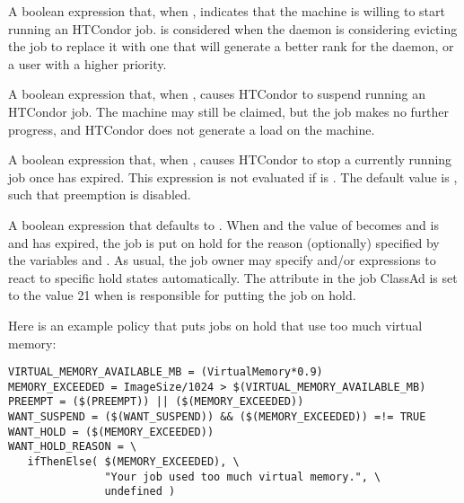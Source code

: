 \begin{description}

\label{param:Start}
\item[\Macro{START}]
  A boolean expression
  that, when , indicates that the machine is willing
  to start running an HTCondor job.
   is considered when the  daemon
  is considering evicting the job to replace it with one that will
  generate a better rank for the  daemon,
  or a user with a higher priority.

\label{param:Suspend}
\item[\Macro{SUSPEND}]
  A boolean expression that, when ,
  causes HTCondor to suspend running an HTCondor job.
  The machine may still be claimed, but the job makes no further
  progress, and HTCondor does not generate a load on the machine.

\label{param:Preempt}
\item[\Macro{PREEMPT}]
  A boolean expression that, when ,
  causes HTCondor to stop a currently running job once
   has expired.  This expression is not
  evaluated if  is .
  The default value is , such that preemption is disabled.

\label{param:WantHold}
\item[\Macro{WANT\_HOLD}]
  A boolean expression that defaults to .
  When  and the value of  becomes 
  and  is  and 
  has expired,
  the job is put on hold for the reason
  (optionally) specified by the variables  and
  .
  As usual, the job owner may specify
   and/or 
  expressions to react to specific hold states automatically.
  The attribute  in the job ClassAd is set to 
  the value 21 when
   is responsible for putting the job on hold.

  Here is an example policy that puts jobs on hold
  that use too much virtual memory:

\footnotesize
\begin{verbatim}
VIRTUAL_MEMORY_AVAILABLE_MB = (VirtualMemory*0.9)
MEMORY_EXCEEDED = ImageSize/1024 > $(VIRTUAL_MEMORY_AVAILABLE_MB)
PREEMPT = ($(PREEMPT)) || ($(MEMORY_EXCEEDED))
WANT_SUSPEND = ($(WANT_SUSPEND)) && ($(MEMORY_EXCEEDED)) =!= TRUE
WANT_HOLD = ($(MEMORY_EXCEEDED))
WANT_HOLD_REASON = \
   ifThenElse( $(MEMORY_EXCEEDED), \
               "Your job used too much virtual memory.", \
               undefined )
\end{verbatim}
\normalsize


\end{description}
